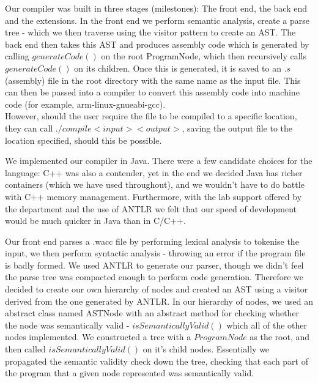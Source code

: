\documentclass[a4paper, 11pt]{article} %
\begin{document}

Our compiler was built in three stages (milestones): The front end, the back end and the extensions. In the front end we perform semantic analysis, create a parse tree - which we then traverse using the visitor pattern to create an AST. The back end then takes this AST and produces assembly code which is generated by calling $ generateCode() $ on the root ProgramNode, which then recursively calls $ generateCode() $ on its children. Once this is generated, it is saved to an $ .s $ (assembly) file in the root directory with the same name as the input file. This can then be passed into a compiler to convert this assembly code into machine code (for example, arm-linux-gnueabi-gcc). \\
However, should the user require the file to be compiled to a specific location, they can call $ ./compile < input > < output > $, saving the output file to the location specified, should this be possible.


We implemented our compiler in Java. There were a few candidate choices for the language: C++ was also a contender, yet in the end we decided Java has richer containers (which we have used throughout), and we wouldn't have to do battle with C++ memory management. Furthermore, with the lab support offered by the department and the use of ANTLR we felt that our speed of development would be much quicker in Java than in C/C++. 

Our front end parses a .wacc file by performing lexical analysis to tokenise the input, we then perform syntactic analysis - throwing an error if the program file is badly formed. We used ANTLR to generate our parser, though we didn't feel the parse tree was compacted enough to perform code generation. Therefore we decided to create our own hierarchy of nodes and created an AST using a visitor derived from the one generated by ANTLR. 
In our hierarchy of nodes, we used an abstract class named ASTNode with an abstract method for checking whether the node was semantically valid - $ isSemanticallyValid() $ which all of the other nodes implemented.  We constructed a tree with a $ ProgramNode $ as the root, and then called $ isSemanticallyValid() $ on it's child nodes. Essentially we propagated the semantic validity check down the tree, checking that each part of the program that a given node represented was semantically valid.
\end{document}
